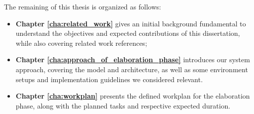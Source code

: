 The remaining of this thesis is organized as follows:
\begin{itemize}
	\item \textbf{Chapter \ref{cha:related_work}} gives an initial background fundamental to understand the objectives and expected contributions of this dissertation, while also covering related work references; 
	\item \textbf{Chapter \ref{cha:approach_of_elaboration_phase}} introduces our system approach, covering the model and architecture, as well as some environment setups and implementation guidelines we considered relevant.
	\item \textbf{Chapter \ref{cha:workplan}} presents the defined workplan for the elaboration phase, along with the planned tasks and respective expected duration.
\end{itemize}
